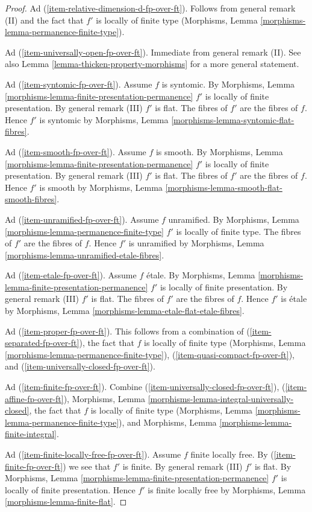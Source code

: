 \begin{proof}
\medskip\noindent
Ad (\ref{item-relative-dimension-d-fp-over-ft}).
Follows from general remark (II) and the fact that $f'$
is locally of finite type
(Morphisms, Lemma \ref{morphisms-lemma-permanence-finite-type}).

\medskip\noindent
Ad (\ref{item-universally-open-fp-over-ft}).
Immediate from general remark (II). See also
Lemma \ref{lemma-thicken-property-morphisms} for a more general statement.

\medskip\noindent
Ad (\ref{item-syntomic-fp-over-ft}). Assume $f$ is syntomic. By
Morphisms, Lemma \ref{morphisms-lemma-finite-presentation-permanence}
$f'$ is locally of finite presentation.
By general remark (III) $f'$ is flat. The fibres of $f'$ are the fibres
of $f$. Hence $f'$ is syntomic by
Morphisms, Lemma \ref{morphisms-lemma-syntomic-flat-fibres}.

\medskip\noindent
Ad (\ref{item-smooth-fp-over-ft}). Assume $f$ is smooth. By
Morphisms, Lemma \ref{morphisms-lemma-finite-presentation-permanence}
$f'$ is locally of finite presentation.
By general remark (III) $f'$ is flat. The fibres of $f'$ are the
fibres of $f$. Hence $f'$ is smooth by
Morphisms, Lemma \ref{morphisms-lemma-smooth-flat-smooth-fibres}.

\medskip\noindent
Ad (\ref{item-unramified-fp-over-ft}). Assume $f$ unramified. By
Morphisms, Lemma \ref{morphisms-lemma-permanence-finite-type}
$f'$ is locally of finite type. The fibres of $f'$ are the fibres of $f$.
Hence $f'$ is unramified by
Morphisms, Lemma \ref{morphisms-lemma-unramified-etale-fibres}.

\medskip\noindent
Ad (\ref{item-etale-fp-over-ft}). Assume $f$ \'etale. By
Morphisms, Lemma \ref{morphisms-lemma-finite-presentation-permanence}
$f'$ is locally of finite presentation.
By general remark (III) $f'$ is flat.
The fibres of $f'$ are the fibres of $f$. Hence $f'$ is \'etale by
Morphisms, Lemma \ref{morphisms-lemma-etale-flat-etale-fibres}.

\medskip\noindent
Ad (\ref{item-proper-fp-over-ft}). This follows from a combination of
(\ref{item-separated-fp-over-ft}), the fact that $f$ is locally
of finite type (Morphisms, Lemma \ref{morphisms-lemma-permanence-finite-type}),
(\ref{item-quasi-compact-fp-over-ft}),
and (\ref{item-universally-closed-fp-over-ft}).

\medskip\noindent
Ad (\ref{item-finite-fp-over-ft}).
Combine (\ref{item-universally-closed-fp-over-ft}),
(\ref{item-affine-fp-over-ft}),
Morphisms, Lemma \ref{morphisms-lemma-integral-universally-closed},
the fact that $f$ is locally of finite type
(Morphisms, Lemma \ref{morphisms-lemma-permanence-finite-type}), and
Morphisms, Lemma \ref{morphisms-lemma-finite-integral}.

\medskip\noindent
Ad (\ref{item-finite-locally-free-fp-over-ft}).
Assume $f$ finite locally free. By
(\ref{item-finite-fp-over-ft}) we see that $f'$ is finite.
By general remark (III) $f'$ is flat.
By Morphisms, Lemma \ref{morphisms-lemma-finite-presentation-permanence}
$f'$ is locally of finite presentation. Hence $f'$ is finite locally free by
Morphisms, Lemma \ref{morphisms-lemma-finite-flat}.
\end{proof}

